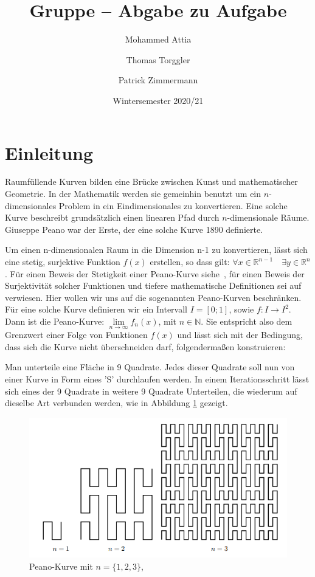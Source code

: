 \documentclass[course=asp]{aspdoc}
\author{Mohammed Attia \and Thomas Torggler \and Patrick Zimmermann}
\date{Wintersemester 2020/21} %
\title{Gruppe \theGroup{} -- Abgabe zu Aufgabe \theNumber}
\begin{document}
\maketitle

\newpage
\section{Einleitung} \label{Einleitung}

Raumf\"ullende Kurven bilden eine Br\"ucke zwischen Kunst und mathematischer Geometrie. In der Mathematik werden sie gemeinhin benutzt um ein $n$-dimensionales Problem in ein Eindimensionales zu konvertieren. Eine solche Kurve beschreibt grunds\"atzlich einen linearen Pfad durch $n$-dimensionale R\"aume. Giuseppe Peano war der Erste, der eine solche Kurve 1890 definierte.

Um einen n-dimensionalen Raum in die Dimension n-1 zu konvertieren, l\"asst sich eine stetig, surjektive Funktion $f(x)$ erstellen, so dass gilt: $\forall x \in \mathbb{R}^{n-1} \quad \exists y \in \mathbb{R}^n$. F\"ur einen Beweis der Stetigkeit einer Peano-Kurve siehe~\cite{stetigkeitsBeweis}, f\"ur einen Beweis der Surjektivit\"at solcher Funktionen und tiefere mathematische Definitionen sei auf ~\cite{surjektivBeweis} verwiesen.
Hier wollen wir uns auf die sogenannten Peano-Kurven beschr\"anken. F\"ur eine solche Kurve definieren wir ein Intervall $I = [0;1]$, sowie  $f: I \rightarrow I^2 $. Dann ist die Peano-Kurve: $\lim\limits_{n \to \infty}f_n(x)$, mit $n \in \mathbb{N}$. Sie entspricht also dem Grenzwert einer Folge von Funktionen $f(x)$ und l\"asst sich mit der Bedingung, dass sich die Kurve nicht \"uberschneiden darf, folgenderma\ss en konstruieren:

Man unterteile eine Fl\"ache in 9 Quadrate. Jedes dieser Quadrate soll nun von einer Kurve in Form eines 'S' durchlaufen werden.
In einem Iterationsschritt l\"asst sich eines der 9 Quadrate in weitere 9 Quadrate Unterteilen, die wiederum auf dieselbe Art verbunden werden, wie in Abbildung \ref{Abb:Peano} gezeigt.

\begin{figure} [ht] %
\centering
\includegraphics[scale=0.9]{PeanoBsp.png}
\caption{Peano-Kurve mit $n = \{1, 2, 3\}$, ~\cite{aufgabenstellung}}\label{Abb:Peano}
\end{figure}
\end{document}
